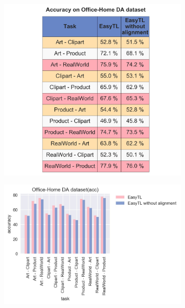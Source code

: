 \begin{figure}
	\centering
	\begin{subfigure}[b]{0.25\textwidth}
		\centering
		\includegraphics[width=\linewidth]{images/4_1.jpg}
		\caption{}
	\end{subfigure}%
	\begin{subfigure}[b]{0.35\textwidth}
		\centering
		\includegraphics[width=\linewidth]{images/4_2.jpg}
		\caption{}
	\end{subfigure}%
	\begin{subfigure}[b]{0.35\textwidth}
		\centering

\end{subfigure}
\end{figure}
